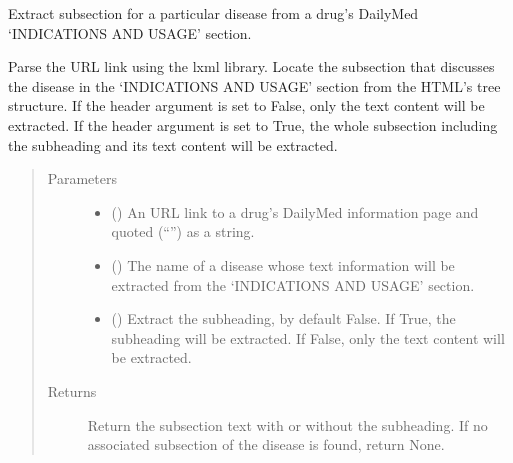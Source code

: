 \documentclass[letterpaper,10pt,english]{sphinxmanual}
\begin{document}
\begin{fulllineitems}
\label{\detokenize{biomarker_extraction:biomarker_extraction.disease_content}}
\sphinxAtStartPar
Extract subsection for a particular disease from a drug’s DailyMed ‘INDICATIONS AND USAGE’ section.

\sphinxAtStartPar
Parse the URL link using the lxml library. Locate the subsection that discusses the disease in the ‘INDICATIONS AND USAGE’ section from the HTML’s tree structure.
If the header argument is set to False, only the text content will be extracted. If the header argument is set to True, the whole subsection including the subheading and its text content will be extracted.
\begin{quote}\begin{description}
\item[{Parameters}] \leavevmode\begin{itemize}
\item {} 
\sphinxAtStartPar
{} () \textendash{} An URL link to a drug’s DailyMed information page and quoted (“”) as a string.

\item {} 
\sphinxAtStartPar
{} () \textendash{} The name of a disease whose text information will be extracted from the ‘INDICATIONS AND USAGE’ section.

\item {} 
\sphinxAtStartPar
{} (\sphinxstyleliteralemphasis{\sphinxupquote{, }}) \textendash{} Extract the subheading, by default False.
If True, the subheading will be extracted.
If False, only the text content will be extracted.

\end{itemize}

\item[{Returns}] \leavevmode
\sphinxAtStartPar
Return the subsection text with or without the subheading.
If no associated subsection of the disease is found, return None.


\end{description}
\end{quote}
\end{fulllineitems}
\end{document}
